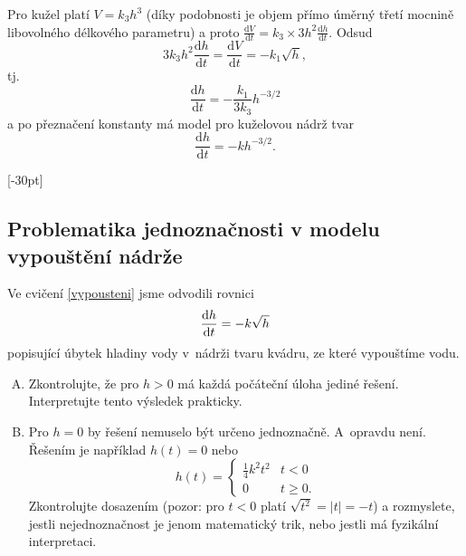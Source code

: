 Pro kužel platí $V=k_3h^3$ (díky podobnosti je objem přímo úměrný třetí mocnině libovolného délkového parametru) a proto
$\frac {\mathrm dV}{\mathrm dt}=k_3 \times 3h^2 \frac {\mathrm dh}{\mathrm dt}$.
Odsud
$$3k_3 h^2 \frac {\mathrm dh}{\mathrm dt}=\frac {\mathrm dV}{\mathrm dt}=-k_1\sqrt h,$$
tj. 
$$\frac {\mathrm dh}{\mathrm dt}=-\frac{k_1}{3k_3}h^{-3/2}$$
a po přeznačení konstanty má model pro kuželovou nádrž tvar
$$\frac {\mathrm dh}{\mathrm dt}=-kh^{-3/2}.$$


\konec

\stranka
{}[-30pt]


\subsection{Problematika jednoznačnosti v modelu vypouštění nádrže}

Ve cvičení \ref{vypousteni}  jsme odvodili rovnici
$$\frac{\mathrm dh}{\mathrm dt}=-k\sqrt h$$
popisující úbytek hladiny vody v nádrži tvaru kvádru, ze které vypouštíme vodu.
\begin{enumerate}[A)]
\item Zkontrolujte, že pro $h>0$ má každá počáteční úloha jediné řešení. Interpretujte tento výsledek prakticky.
\item Pro $h=0$ by řešení nemuselo být určeno jednoznačně. A opravdu
  není. Řešením je například $h(t)=0$ nebo $$h(t)=
  \begin{cases}
    \frac 14 k^2 t^2 & t<0\\
    0 & t\geq 0.
  \end{cases}
  $$
Zkontrolujte dosazením (pozor: pro $t<0$ platí $\sqrt {t^2}=|t|=-t$) a rozmyslete, jestli nejednoznačnost je jenom matematický trik, nebo jestli má
 fyzikální interpretaci.
\end{enumerate}

